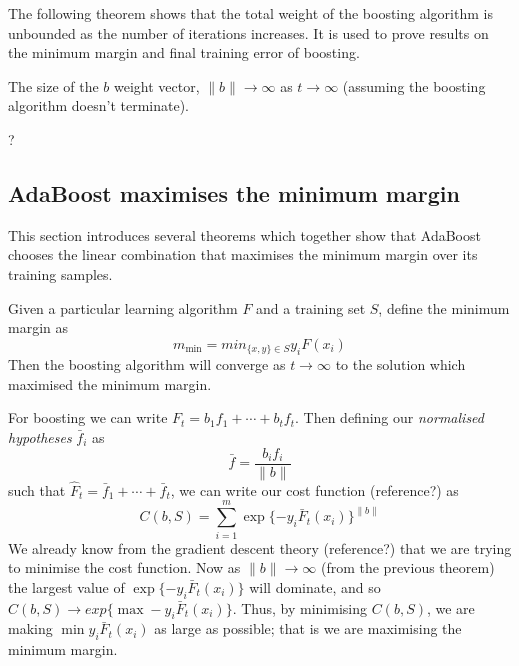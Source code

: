 The following theorem shows that the total weight of the boosting
algorithm is unbounded as the number of iterations increases.  It is
used to prove results on the minimum margin and final training error
of boosting.

\begin{theorem}
The size of the $b$ weight vector, $\|b\| \rightarrow \infty$
as $t \rightarrow \infty$ (assuming the boosting algorithm doesn't
terminate).

\proof ?
\end{theorem}



\subsection{AdaBoost maximises the minimum margin}

This section introduces several theorems which together show that
AdaBoost chooses the linear combination that maximises the minimum
margin over its training samples.

\begin{theorem}
Given a particular learning algorithm $F$ and a training
set $S$, define the minimum margin as
\[
m_{\min} = min_{\{x,y\} \in S} y_i F(x_i)
\]
Then the boosting algorithm will converge as $t \rightarrow \infty$ to
the solution which maximised the minimum margin.

\proof For boosting we can write $F_t = b_1 f_1 + \cdots + b_t f_t$.
Then defining our \emph{normalised hypotheses} $\bar{f}_i$ as
\[
\bar{f} = \frac{b_i f_i}{\|b\|}
\]
such that $\hat{F}_t = \bar{f}_1 + \cdots + \bar{f}_t$, we can write
our cost function (reference?) as 
\[
C(b, S) = \sum_{i=1}^{m} \exp\{-y_i \bar{F}_t(x_i)\}^{\|b\|}
\]
We already know from the gradient descent theory (reference?) that we
are trying to minimise the cost function.  Now as $\|b\| \rightarrow
\infty$ (from the previous theorem) the largest value of $\exp\{-y_i
\bar{F}_t(x_i)\}$ will dominate, and so $C(b, S) \rightarrow exp\{\max
-y_i \bar{F}_t(x_i)\}$.  Thus, by minimising $C(b, S)$, we are making
$\min y_i \bar{F}_t(x_i)$ as large as possible; that is we are
maximising the minimum margin.
\end{theorem}


